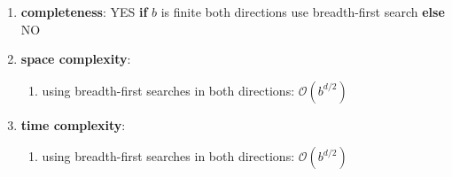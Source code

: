 \begin{enumerate}[itemsep=0.2cm]
\begin{enumerate}
        \item \textbf{completeness}: YES \textbf{if} $b$ is finite  both directions use breadth-first search \textbf{else} NO
        \hfill \cite{ai/book/Artificial-Intelligence-A-Modern-Approach/Russell-Norvig}

        \item \textbf{space complexity}:
        \begin{enumerate}
            \item using breadth-first searches in both directions: $\mathcal{O}(b^{d/2})$
            \hfill \cite{ai/book/Artificial-Intelligence-A-Modern-Approach/Russell-Norvig}
        \end{enumerate}

        \item \textbf{time complexity}:
        \begin{enumerate}
            \item using breadth-first searches in both directions: $\mathcal{O}(b^{d/2})$
            \hfill \cite{ai/book/Artificial-Intelligence-A-Modern-Approach/Russell-Norvig}
        \end{enumerate}
    \end{enumerate}
\end{enumerate}






















